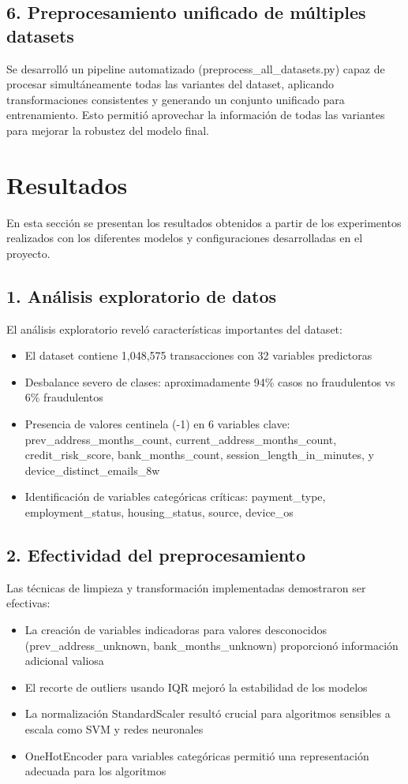 \documentclass{llncs}
\begin{document}
\subsection{6. Preprocesamiento unificado de múltiples datasets}
Se desarrolló un pipeline automatizado (preprocess\_all\_datasets.py) capaz de procesar simultáneamente todas las variantes del dataset, aplicando transformaciones consistentes y generando un conjunto unificado para entrenamiento. Esto permitió aprovechar la información de todas las variantes para mejorar la robustez del modelo final.

\section{Resultados}

En esta sección se presentan los resultados obtenidos a partir de los experimentos realizados con los diferentes modelos y configuraciones desarrolladas en el proyecto.

\subsection{1. Análisis exploratorio de datos}

El análisis exploratorio reveló características importantes del dataset:
\begin{itemize}
    \item El dataset contiene 1,048,575 transacciones con 32 variables predictoras
    \item Desbalance severo de clases: aproximadamente 94\% casos no fraudulentos vs 6\% fraudulentos
    \item Presencia de valores centinela (-1) en 6 variables clave: prev\_address\_months\_count, current\_address\_months\_count, credit\_risk\_score, bank\_months\_count, session\_length\_in\_minutes, y device\_distinct\_emails\_8w
    \item Identificación de variables categóricas críticas: payment\_type, employment\_status, housing\_status, source, device\_os
\end{itemize}

\subsection{2. Efectividad del preprocesamiento}

Las técnicas de limpieza y transformación implementadas demostraron ser efectivas:
\begin{itemize}
    \item La creación de variables indicadoras para valores desconocidos (prev\_address\_unknown, bank\_months\_unknown) proporcionó información adicional valiosa
    \item El recorte de outliers usando IQR mejoró la estabilidad de los modelos
    \item La normalización StandardScaler resultó crucial para algoritmos sensibles a escala como SVM y redes neuronales
    \item OneHotEncoder para variables categóricas permitió una representación adecuada para los algoritmos
\end{itemize}
\end{document}
